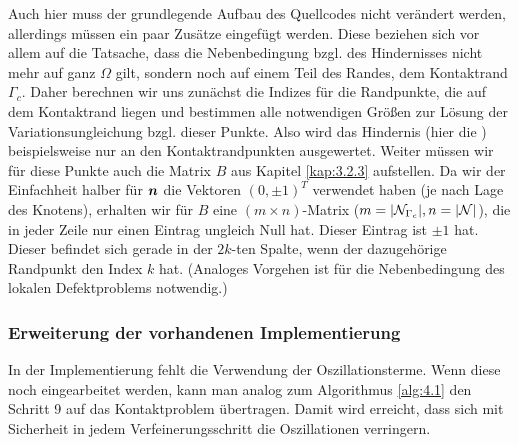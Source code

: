 Auch hier muss der grundlegende Aufbau des Quellcodes nicht verändert werden, allerdings müssen ein paar Zusätze eingefügt werden. Diese beziehen sich vor allem auf die Tatsache, dass die Nebenbedingung bzgl. des Hindernisses nicht mehr auf ganz $\Omega$ gilt, sondern noch auf einem Teil des Randes, dem Kontaktrand $\Gamma_c$. Daher berechnen wir uns zunächst die Indizes für die Randpunkte, die auf dem Kontaktrand liegen und bestimmen alle notwendigen Größen zur Lösung der Variationsungleichung bzgl. dieser Punkte. Also wird das Hindernis (hier die ) beispielsweise nur an den Kontaktrandpunkten ausgewertet. Weiter müssen wir für diese Punkte auch die Matrix $B$ aus Kapitel \ref{kap:3.2.3} aufstellen. Da wir der Einfachheit halber für $\boldsymbol n$ die Vektoren $(0,\pm 1)^T$ verwendet haben (je nach Lage des Knotens), erhalten wir für $B$ eine $(m\times n)$-Matrix ($m = \lvert \mathcal N_{\Gamma_c}\rvert, n = \lvert \mathcal N\rvert$), die in jeder Zeile nur einen Eintrag ungleich Null hat. Dieser Eintrag ist $\pm 1$ hat. Dieser befindet sich gerade in der $2k$-ten Spalte, wenn der dazugehörige Randpunkt den Index $k$ hat. (Analoges Vorgehen ist für die Nebenbedingung des lokalen Defektproblems notwendig.)


\subsubsection{Erweiterung der vorhandenen Implementierung}

In der Implementierung fehlt die Verwendung der Oszillationsterme. Wenn diese noch eingearbeitet werden, kann man analog zum Algorithmus \ref{alg:4.1} den Schritt 9 auf das Kontaktproblem übertragen. Damit wird erreicht, dass sich mit Sicherheit in jedem Verfeinerungsschritt die Oszillationen verringern.



\newpage

